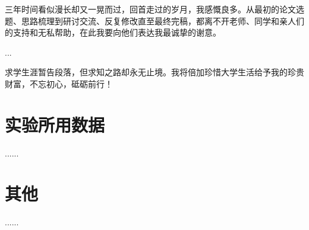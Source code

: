 \documentclass[twoside,a4paper,12pt]{book}
\begin{document}
\begin{jluAcknowledgment}
三年时间看似漫长却又一晃而过，回首走过的岁月，我感慨良多。从最初的论文选题、思路梳理到研讨交流、反复修改直至最终完稿，都离不开老师、同学和亲人们的支持和无私帮助，在此我要向他们表达我最诚挚的谢意。

...

求学生涯暂告段落，但求知之路却永无止境。我将倍加珍惜大学生活给予我的珍贵财富，不忘初心，砥砺前行！
\end{jluAcknowledgment}

\appendix
\begin{appendices}
	\chapter{实验所用数据}
	......
	\chapter{其他}
	......
\end{appendices}
\end{document}
